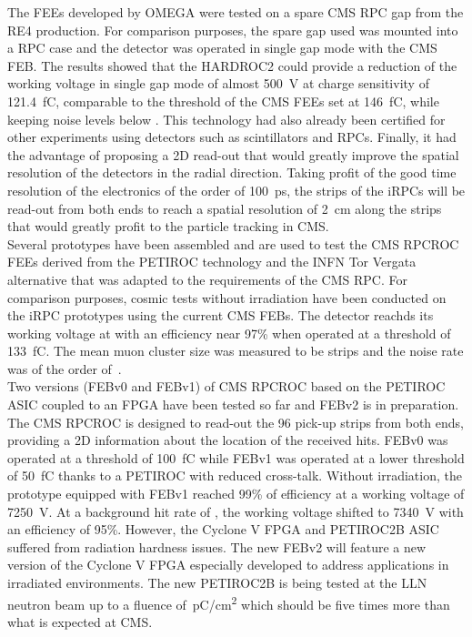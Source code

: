 	The FEEs developed by OMEGA were tested on a spare CMS RPC gap from the RE4 production. For comparison purposes, the spare gap used was mounted into a RPC case and the detector was operated in single gap mode with the CMS FEB. The results showed that the HARDROC2 could provide a reduction of the working voltage in single gap mode of almost \SI{500}{V} at charge sensitivity of \SI{121.4}{fC}, comparable to the threshold of the CMS FEEs set at \SI{146}{fC}, while keeping noise levels below . This technology had also already been certified for other experiments using detectors such as scintillators and RPCs. Finally, it had the advantage of proposing a 2D read-out that would greatly improve the spatial resolution of the detectors in the radial direction. Taking profit of the good time resolution of the electronics of the order of \SI{100}{ps}, the strips of the iRPCs will be read-out from both ends to reach a spatial resolution of \SI{2}{cm} along the strips that would greatly profit to the particle tracking in CMS.\\
	Several prototypes have been assembled and are used to test the CMS RPCROC FEEs derived from the PETIROC technology and the INFN Tor Vergata alternative that was adapted to the requirements of the CMS RPC. For comparison purposes, cosmic tests without irradiation have been conducted on the iRPC prototypes using the current CMS FEBs. The detector reachds its working voltage at  with an efficiency near 97\% when operated at a threshold of \SI{133}{fC}. The mean muon cluster size was measured to be  strips and the noise rate was of the order of \,\sirate.\\
	Two versions (FEBv0 and FEBv1) of CMS RPCROC based on the PETIROC ASIC coupled to an FPGA have been tested so far and FEBv2 is in preparation. The CMS RPCROC is designed to read-out the 96 pick-up strips from both ends, providing a 2D information about the location of the received hits. FEBv0 was operated at a threshold of \SI{100}{fC} while FEBv1 was operated at a lower threshold of \SI{50}{fC} thanks to a PETIROC with reduced cross-talk. Without irradiation, the prototype equipped with FEBv1 reached 99\% of efficiency at a working voltage of \SI{7250}{V}. At a background hit rate of , the working voltage shifted to \SI{7340}{V} with an efficiency of 95\%. However, the Cyclone V FPGA and PETIROC2B ASIC suffered from radiation hardness issues. The new FEBv2 will feature a new version of the Cyclone V FPGA especially developed to address applications in irradiated environments. The new PETIROC2B is being tested at the \acf{LLN} neutron beam up to a fluence of \,\si{pC/cm^2} which should be five times more than what is expected at CMS.\\
